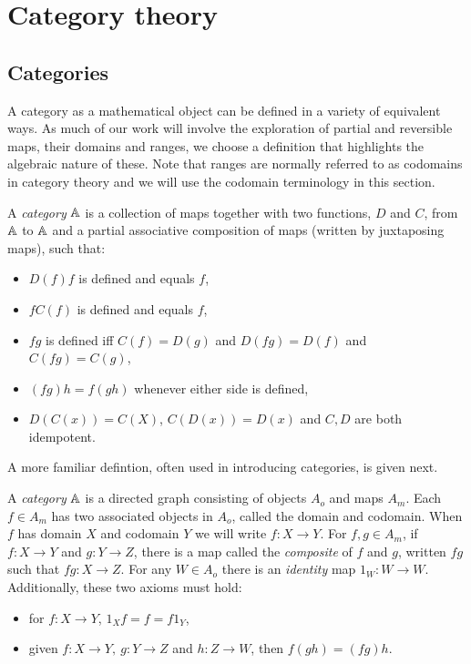 
\chapter{Category theory}\label{chap:category_theory}
\section{Categories} %
\label{sec:categories}

A category as a mathematical object can be defined in a variety of equivalent ways. As much of our
work will involve the exploration of partial and reversible maps, their domains and ranges, we
choose a definition that highlights the algebraic nature of these. Note that ranges are normally
referred to as codomains in category theory and we will use the codomain terminology in this
section.

\begin{definition}\label{def:category}
  A \emph{category} $\mathbb{A}$ is a collection of maps together with two functions, $D$ and $C$, from
  $\mathbb{A}$ to $\mathbb{A}$ and a partial associative composition of maps (written by juxtaposing maps), such
  that:
  \begin{itemize}
    \item[\catone] $D(f) f$ is defined and equals $f$,
    \item[\cattwo] $f C(f)$ is defined and equals $f$,
    \item[\catthree] $f g$ is defined iff $C(f) = D(g)$ and $D(f g) = D(f)$ and $C(f g) = C(g)$,
    \item[\catfour] $(f g) h = f (g h)$ whenever either side is defined,
    \item[\catfive] $D(C(x)) = C(X)$, $C(D(x)) = D(x)$ and $C,D$ are both idempotent.
  \end{itemize}
\end{definition}

A more familiar defintion, often used in introducing categories, is given next.

\begin{definition}\label{def:category_alt}
  A \emph{category} $\mathbb{A}$ is a directed graph consisting of objects $A_o$ and maps $A_m$. Each $f\in
  A_m$ has two associated objects in $A_o$, called the domain and codomain. When $f$ has domain $X$
  and codomain $Y$ we will write $f:X \to Y$. For $f, g \in A_m$, if $f:X\to Y$ and $g:Y \to Z$,
  there is a map called the \emph{composite} of $f$ and $g$, written $fg$ such that $fg:X \to Z$.
  For any $W \in A_o$ there is an \emph{identity} map $1_W:W \to W$. Additionally, these two axioms
  must hold:
  \begin{itemize}
    \item[\axiom{C'}{1}] for $f:X \to Y$, $1_X f = f = f 1_Y$,
    \item[\axiom{C'}{2}] given $f:X \to Y,\ g:Y \to Z$ and $h: Z\to W$, then $f (g h) = (f g) h$.
  \end{itemize}
  
\end{definition}

